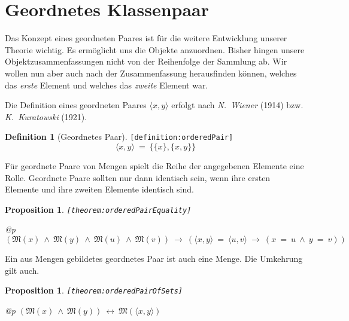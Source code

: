 \documentclass[a4paper,german,10pt,twoside]{book}
\newtheorem{prop}[thm]{Proposition}
\theoremstyle{definition}
\newtheorem{defn}{Definition}
\theoremstyle{remark}
\begin{document}
\section{Geordnetes Klassenpaar} \label{chapter5_section2} \hypertarget{chapter5_section2}{}
Das Konzept eines geordneten Paares ist f{\"u}r die weitere Entwicklung unserer Theorie wichtig.
Es erm{\"o}glicht uns die Objekte anzuordnen. Bisher hingen unsere Objektzusammenfassungen nicht
von der Reihenfolge der Sammlung ab. Wir wollen nun aber auch nach der Zusammenfassung
herausfinden k{\"o}nnen, welches das \emph{erste} Element und welches das \emph{zweite} Element
war.

\par
Die Definition eines geordneten Paares $\langle x, y\rangle$ erfolgt nach \emph{N.~Wiener} (1914) bzw. \emph{K.~Kuratowski} (1921).

\begin{defn}[Geordnetes Paar]
\label{definition:orderedPair} \hypertarget{definition:orderedPair}{}
{\tt \tiny [\verb]definition:orderedPair]]}
$$\langle x, y \rangle \ = \ \{ \{ x \}, \{ x, y \} \}$$
\end{defn}


\par
F{\"u}r geordnete Paare von Mengen spielt die Reihe der angegebenen Elemente
eine Rolle. Geordnete Paare sollten nur dann identisch sein, wenn
ihre ersten Elemente und ihre zweiten Elemente identisch sind.

\begin{prop}
\label{theorem:orderedPairEquality} \hypertarget{theorem:orderedPairEquality}{}
{\tt \tiny [\verb]theorem:orderedPairEquality]]}
\mbox{}
\begin{longtable}{{@{\extracolsep{\fill}}p{\linewidth}}}
\centering $(\mathfrak{M}(x)\ \land\ \mathfrak{M}(y)\ \land\ \mathfrak{M}(u)\ \land\ \mathfrak{M}(v))\ \rightarrow\ (\langle x, y \rangle \ = \ \langle u, v \rangle\ \rightarrow\ (x \ = \ u\ \land\ y \ = \ v))$
\end{longtable}

\end{prop}


\par
Ein aus Mengen gebildetes geordnetes Paar ist auch eine Menge. 
Die Umkehrung gilt auch.

\begin{prop}
\label{theorem:orderedPairOfSets} \hypertarget{theorem:orderedPairOfSets}{}
{\tt \tiny [\verb]theorem:orderedPairOfSets]]}
\mbox{}
\begin{longtable}{{@{\extracolsep{\fill}}p{\linewidth}}}
\centering $(\mathfrak{M}(x)\ \land\ \mathfrak{M}(y))\ \leftrightarrow\ \mathfrak{M}(\langle x, y \rangle)$
\end{longtable}

\end{prop}
\end{document}
